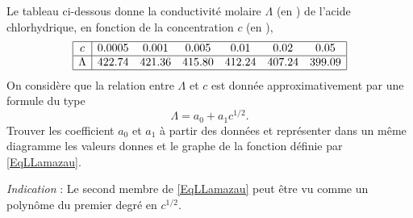 \begin{exercice}\label{exoSC_serie3-0004}

	Le tableau ci-dessous donne la conductivité molaire $\Lambda$ (en \reciprocal\ohm\centi\square\meter\per\mole) de l'acide chlorhydrique, en fonction de la concentration $c$ (en \mole\per\deci\cubic\meter),
	\[
		\begin{array}{|c|cccccc|}
			\hline
			c& 0.0005& 0.001	&0.005&0.01&	0.02	&	0.05 \\
			\hline
			\Lambda&   422.74 & 421.36 & 415.80 & 412.24 & 407.24 & 399.09  \\
			\hline
		\end{array}
	\]
	On considère que la relation entre $\Lambda$ et $c$ est donnée approximativement par une formule du type
	\begin{equation}	\label{EqLLamazau}
		\Lambda=a_0+a_1c^{1/2}.
	\end{equation}
	Trouver les coefficient $a_0$ et $a_1$ à partir des données et représenter dans un même diagramme les valeurs donnes et le graphe de la fonction définie par \eqref{EqLLamazau}.

	\emph{Indication} : Le second membre de \eqref{EqLLamazau} peut être vu comme un polynôme du premier degré en $c^{1/2}$.

\end{exercice}
